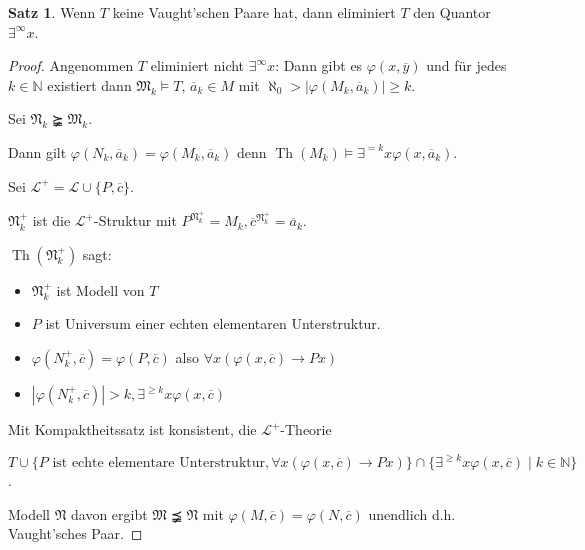 \documentclass[12pt,parskip=full]{scrartcl}
\newcommand{\setN}{\mathbb{N}}
\newcommand{\abs}[1]{{\left| #1 \right|}}
\theoremstyle{definition}
\newtheorem{theorem}{Satz}[section]
\begin{document}
 	\begin{theorem}
 		Wenn $T$ keine Vaught'schen Paare hat, dann eliminiert $T$ den Quantor $\exists^\infty x$.
 	\end{theorem}
 
 	\begin{proof}
 		Angenommen $T$ eliminiert nicht $\exists^\infty x$: Dann gibt es $\varphi(x, \overline{y})$ und für jedes $k \in \setN$ existiert dann $\mathfrak{M}_k \models T$, $\overline{a}_k \in M$ mit $\aleph_0 > \abs{\varphi(M_k, \overline{a}_k)} \geq k$.
 		
 		Sei $\mathfrak{N}_k \succneqq \mathfrak{M}_k$.
 		
 		Dann gilt $\varphi(N_k, \overline{a}_k) = \varphi(M_k, \overline{a}_k)$ denn $\operatorname{Th}(M_k) \models \exists^{=k} x \varphi(x, \overline{a}_k)$.
 		
 		Sei $\mathcal{L}^+ = \mathcal{L} \cup \{ P, \overline{c} \}$.
 		
 		$\mathfrak{N}_k^+$ ist die $\mathcal{L}^+$-Struktur mit $P^{\mathfrak{N}_k^+} = M_k, \overline{c}^{\mathfrak{N}_k^+} = \overline{a}_k$.
 		
 		$\operatorname{Th}(\mathfrak{N}_k^+)$ sagt:
 		\begin{itemize}
 			\item $\mathfrak{N}_k^+$ ist Modell von $T$
 			\item $P$ ist Universum einer echten elementaren Unterstruktur.
 			\item $\varphi(N_k^+, \overline{c}) = \varphi(P, \overline{c})$ also $\forall x (\varphi(x, \overline{c}) \rightarrow Px)$
 			\item $\abs{\varphi(N_k^+, \overline{c})} > k, \exists^{\geq k} x \varphi(x, \overline{c})$
 		\end{itemize}
 	
 		Mit Kompaktheitssatz ist konsistent, die $\mathcal{L}^+$-Theorie
 		
 		$T \cup \{ \text{$P$ ist echte elementare Unterstruktur}, \forall x (\varphi(x, \overline{c}) \rightarrow P x) \} \cap \{ \exists^{\geq k} x \varphi(x, \overline{c}) \mid k \in \setN \}$.
 		
 		Modell $\mathfrak{N}$ davon ergibt $\mathfrak{M} \precneqq \mathfrak{N}$ mit $\varphi(M, \overline{c}) = \varphi(N, \overline{c})$ unendlich d.h. Vaught'sches Paar.
 	\end{proof}
 
\end{document}
